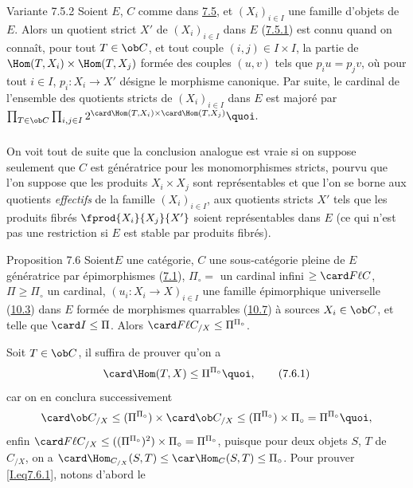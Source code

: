 \begin{enonce*}[remark]{Variante 7.5.2}
Soient $E$, $C$ comme dans \hyperref[I.cor7.5]{7.5}, et $(X_i)_{i\in I}$ une famille
d'objets de $E$. Alors un quotient strict $X'$ de $(X_i)_{i\in I}$
dans $E$ (\hyperref[I.sec7.5.1]{7.5.1}) est connu quand on connaît, pour tout
$T\in \ob C$,
et tout couple $(i,j)\in I\times I$, la partie de $\Hom(T,X_i)\times
\Hom(T,X_j)$ formée des couples $(u,v)$ tels que $p_iu=p_jv$, où
pour tout $i\in I$, $p_i:X_i\rightarrow X'$ désigne le morphisme
canonique. Par suite, le cardinal de l'ensemble des quotients
stricts de $(X_i)_{i\in I}$ dans $E$ est majoré par $ \prod_{T\in
\ob C} \prod_{i, j\in I}2^{\card \Hom(T,X_i)\times
  \card\Hom(T,X_j)}{\quoi}.
$
\end{enonce*}

\setcounter{subsubsection}{2}
\subsubsection{}
On voit tout de suite que la conclusion analogue est vraie si on
suppose seulement que $C$ est génératrice pour les monomorphismes
stricts, pourvu que l'on suppose que les produits $X_i\times X_j$
sont représentables et que l'on se borne aux quotients
\emph{effectifs} de la famille $(X_{i})_{i\in I}$, \ie aux quotients
stricts $X'$ tels que les produits fibrés $\fprod{X_i}{X_{j}}{X'}$
soient représentables dans $E$ (ce qui n'est pas une restriction si
$E$ est stable par produits fibrés).

\begin{enonce*}{Proposition 7.6}
Soient\pageoriginale $E$ une catégorie, $C$ une sous-catégorie
pleine de $E$ génératrice par épimorphismes
(\hyperref[I.def7.1]{7.1}), $\Pi_\circ=$ un
cardinal infini $\geq \card  F\ell  C$, $\Pi\geq \Pi_\circ$ un
cardinal, $(u_i:X_i\rightarrow X)_{i\in I}$ une famille épimorphique
universelle (\hyperref[I.sec10.3]{10.3}) dans $E$ formée de morphismes quarrables
(\hyperref[I.sec10.7]{10.7}) à sources $X_i\in\ob C$, et telle que $\card I\leq \Pi$.
Alors $\card F\ell  C_{/X}\leq \Pi^{\Pi_\circ}$.
\end{enonce*}

Soit $T\in \ob C$, il suffira de prouver qu'on a
\begin{equation*}
\card\Hom(T,X)\leq
  \Pi^{\Pi_\circ}{\quoi},\tag{7.6.1}
\end{equation*}\label{I.eq7.6.1}
car on en conclura successivement
$$
\card\ob C_{/X}\leq(\Pi^{\Pi_\circ})\times\card \ob C_{/X}\leq
(\Pi^{\Pi_\circ})\times \Pi_\circ=\Pi^{\Pi_\circ}{\quoi},
$$
enfin $\card F\ell C_{/X}\leq ((\Pi^{\Pi_\circ})^2)\times
\Pi_\circ=\Pi^{\Pi_\circ}$, puisque pour deux objets $S$, $T$ de
$C_{/X}$, on a $\card \Hom_{C_{/X}}(S,T)\leq
\car\Hom_C(S,T)\leq\Pi_\circ$. Pour prouver \ref{I.eq7.6.1}, notons d'abord le

